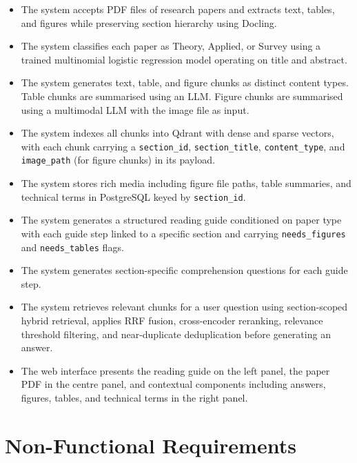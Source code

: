 \documentclass[12pt,a4paper]{report}
\begin{document}
\begin{itemize}
    \item The system accepts PDF files of research papers and extracts text,
          tables, and figures while preserving section hierarchy using Docling.
    \item The system classifies each paper as Theory, Applied, or Survey using
          a trained multinomial logistic regression model operating on title and
          abstract.
    \item The system generates text, table, and figure chunks as distinct content
          types. Table chunks are summarised using an LLM. Figure chunks are
          summarised using a multimodal LLM with the image file as input.
    \item The system indexes all chunks into Qdrant with dense and sparse
          vectors, with each chunk carrying a \texttt{section\_id},
          \texttt{section\_title}, \texttt{content\_type}, and
          \texttt{image\_path} (for figure chunks) in its payload.
    \item The system stores rich media including figure file paths, table
          summaries, and technical terms in PostgreSQL keyed by
          \texttt{section\_id}.
    \item The system generates a structured reading guide conditioned on paper
          type with each guide step linked to a specific section and carrying
          \texttt{needs\_figures} and \texttt{needs\_tables} flags.
    \item The system generates section-specific comprehension questions for each
          guide step.
    \item The system retrieves relevant chunks for a user question using
          section-scoped hybrid retrieval, applies RRF fusion, cross-encoder
          reranking, relevance threshold filtering, and near-duplicate
          deduplication before generating an answer.
    \item The web interface presents the reading guide on the left panel, the
          paper PDF in the centre panel, and contextual components including
          answers, figures, tables, and technical terms in the right panel.
\end{itemize}

\section{Non-Functional Requirements}
\end{document}
